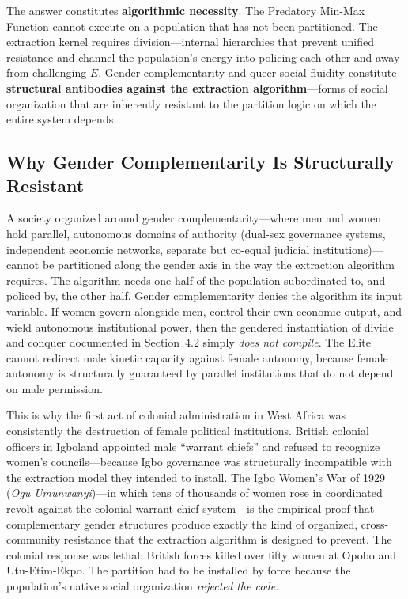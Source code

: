 The answer constitutes \textbf{algorithmic necessity}. The Predatory Min-Max Function cannot execute on a population that has not been partitioned. The extraction kernel requires division---internal hierarchies that prevent unified resistance and channel the population's energy into policing each other and away from challenging $E$. Gender complementarity and queer social fluidity constitute \textbf{structural antibodies against the extraction algorithm}---forms of social organization that are inherently resistant to the partition logic on which the entire system depends.

\subsection{Why Gender Complementarity Is Structurally Resistant}

A society organized around gender complementarity---where men and women hold parallel, autonomous domains of authority (dual-sex governance systems, independent economic networks, separate but co-equal judicial institutions)---cannot be partitioned along the gender axis in the way the extraction algorithm requires. The algorithm needs one half of the population subordinated to, and policed by, the other half. Gender complementarity denies the algorithm its input variable. If women govern alongside men, control their own economic output, and wield autonomous institutional power, then the gendered instantiation of divide and conquer documented in Section~4.2 simply \textit{does not compile}. The Elite cannot redirect male kinetic capacity against female autonomy, because female autonomy is structurally guaranteed by parallel institutions that do not depend on male permission.

This is why the first act of colonial administration in West Africa was consistently the destruction of female political institutions. British colonial officers in Igboland appointed male ``warrant chiefs'' and refused to recognize women's councils---because Igbo governance was structurally incompatible with the extraction model they intended to install. The Igbo Women's War of 1929 (\textit{Ogu Umunwanyi})---in which tens of thousands of women rose in coordinated revolt against the colonial warrant-chief system---is the empirical proof that complementary gender structures produce exactly the kind of organized, cross-community resistance that the extraction algorithm is designed to prevent. The colonial response was lethal: British forces killed over fifty women at Opobo and Utu-Etim-Ekpo. The partition had to be installed by force because the population's native social organization \textit{rejected the code}.

